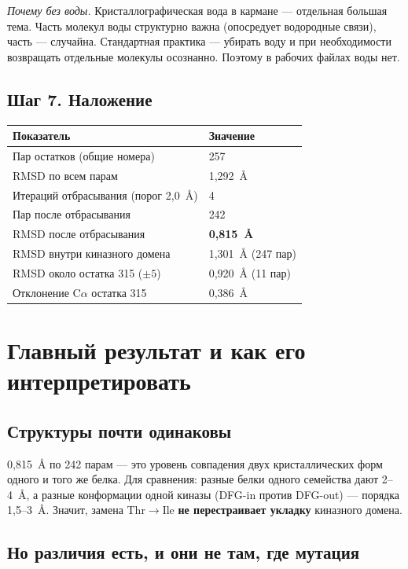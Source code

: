 \documentclass[12pt,a4paper]{article}
\begin{document}
\noindent\emph{Почему без воды.} Кристаллографическая вода в кармане --- отдельная
большая тема. Часть молекул воды структурно важна (опосредует водородные связи),
часть --- случайна. Стандартная практика --- убирать воду и при необходимости
возвращать отдельные молекулы осознанно. Поэтому в рабочих файлах воды нет.

\subsection{Шаг 7. Наложение}

\begin{center}
\begin{tabular}{L{8.6cm}L{5.9cm}}
\toprule
\textbf{Показатель} & \textbf{Значение} \\
\midrule
Пар остатков (общие номера) & 257 \\
RMSD по всем парам & 1{,}292~\AA \\
Итераций отбрасывания (порог 2{,}0~\AA) & 4 \\
Пар после отбрасывания & 242 \\
RMSD после отбрасывания & \textbf{0{,}815~\AA} \\
RMSD внутри киназного домена & 1{,}301~\AA{} (247 пар) \\
RMSD около остатка 315 ($\pm 5$) & 0{,}920~\AA{} (11 пар) \\
Отклонение C$\alpha$ остатка 315 & 0{,}386~\AA \\
\bottomrule
\end{tabular}
\end{center}

\section{Главный результат и как его интерпретировать}

\subsection{Структуры почти одинаковы}

0{,}815~\AA{} по 242 парам --- это уровень совпадения двух кристаллических форм
одного и того же белка. Для сравнения: разные белки одного семейства дают
2--4~\AA, а разные конформации одной киназы (DFG-in против DFG-out) --- порядка
1{,}5--3~\AA. Значит, замена Thr$\rightarrow$Ile \textbf{не перестраивает укладку}
киназного домена.

\subsection{Но различия есть, и они не там, где мутация}
\end{document}

